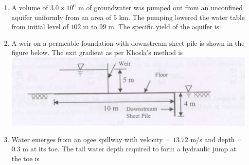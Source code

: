 \documentclass[journal]{IEEEtran}
\begin{document}
\begin{enumerate}
\begin{enumerate}
\end{enumerate}

\item A volume of $3.0 \times 10^{6}$ m of groundwater was pumped out from an unconfined aquifer uniformly from an area of $5$ km. The pumping lowered the water table from initial level of $102$ m to $99$ m. The specific yield of the aquifer is \hfill {}

\begin{enumerate}
\end{enumerate}

\item A weir on a permeable foundation with downstream sheet pile is shown in the figure below. The exit gradient as per Khosla's method is \hfill {}
\includegraphics[width=\columnwidth]{figs/fig4.png} 
\begin{enumerate}
\end{enumerate}

\item Water emerges from an ogee spillway with velocity = $13.72$ m/s and depth = $0.3$ m at its toe. The tail water depth required to form a hydraulic jump at the toe is \hfill {}


\end{enumerate}
\end{document}
